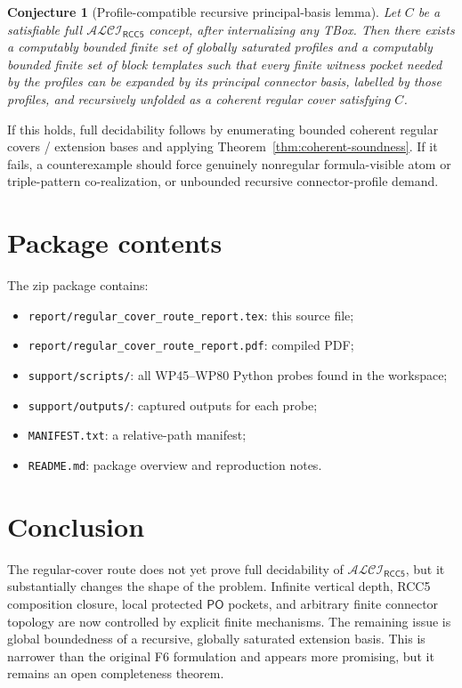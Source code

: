 \documentclass[11pt]{article}
\newtheorem{conjecture}[theorem]{Conjecture}
\newcommand{\PO}{\mathsf{PO}}
\newcommand{\ALCI}{\mathcal{ALCI}_{\mathsf{RCC5}}}
\begin{document}
\begin{conjecture}[Profile-compatible recursive principal-basis lemma]
Let $C$ be a satisfiable full $\ALCI$ concept, after internalizing any TBox.  Then there exists a computably bounded finite set of globally saturated profiles and a computably bounded finite set of block templates such that every finite witness pocket needed by the profiles can be expanded by its principal connector basis, labelled by those profiles, and recursively unfolded as a coherent regular cover satisfying $C$.
\end{conjecture}

If this holds, full decidability follows by enumerating bounded coherent regular covers / extension bases and applying Theorem~\ref{thm:coherent-soundness}.  If it fails, a counterexample should force genuinely nonregular formula-visible atom or triple-pattern co-realization, or unbounded recursive connector-profile demand.

\section{Package contents}
The zip package contains:
\begin{itemize}
\item \texttt{report/regular\_cover\_route\_report.tex}: this source file;
\item \texttt{report/regular\_cover\_route\_report.pdf}: compiled PDF;
\item \texttt{support/scripts/}: all WP45--WP80 Python probes found in the workspace;
\item \texttt{support/outputs/}: captured outputs for each probe;
\item \texttt{MANIFEST.txt}: a relative-path manifest;
\item \texttt{README.md}: package overview and reproduction notes.
\end{itemize}


\section{Conclusion}
The regular-cover route does not yet prove full decidability of $\ALCI$, but it substantially changes the shape of the problem.  Infinite vertical depth, RCC5 composition closure, local protected $\PO$ pockets, and arbitrary finite connector topology are now controlled by explicit finite mechanisms.  The remaining issue is global boundedness of a recursive, globally saturated extension basis.  This is narrower than the original F6 formulation and appears more promising, but it remains an open completeness theorem.
\end{document}
